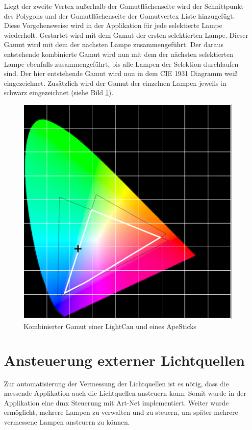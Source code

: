\documentclass[11pt]{scrartcl}
\begin{document}
\noindent
Liegt der zweite Vertex außerhalb der Gamutflächenseite wird der Schnittpunkt des Polygons und der Gamutflächenseite der Gamutvertex Liste hinzugefügt. Diese Vorgehensweise
wird in der Applikation für jede selektierte Lampe wiederholt. Gestartet wird mit dem Gamut der ersten selektierten Lampe. Dieser Gamut wird mit dem der nächsten Lampe
zusammengeführt. Der daraus entstehende kombinierte Gamut wird nun mit dem der nächsten selektierten Lampe ebenfalls zusammengeführt, bis alle Lampen der Selektion
durchlaufen sind. Der hier entstehende Gamut wird nun in dem CIE 1931 Diagramm weiß eingezeichnet. Zusätzlich wird der Gamut der einzelnen Lampen jeweils in schwarz
eingezeichnet (siehe Bild \ref{fig:combinedGamut}).
\begin{figure}[H]
    \begin{center}
        \includegraphics[width=.75\textwidth]{images/combined_gamut_lightCan_lightStick.png}
    \end{center}
    \caption{Kombinierter Gamut einer LightCan und eines ApeSticks}\label{fig:combinedGamut}
\end{figure}
\noindent
\clearpage

\section{Ansteuerung externer Lichtquellen}
Zur automatisierung der Vermessung der Lichtquellen ist es nötig, dass die messende Applikation auch die Lichtquellen ansteuern kann. Somit wurde
in der Applikation eine \ac{dmx} Steuerung mit Art-Net implementiert. Weiter wurde ermöglicht, mehrere Lampen zu verwalten und zu steuern, um später mehrere
vermessene Lampen ansteuern zu können.
\end{document}
